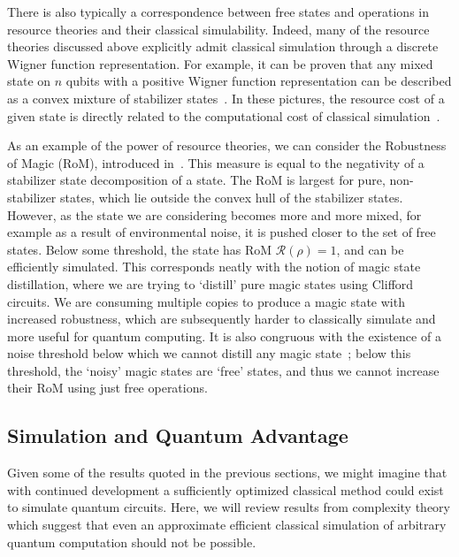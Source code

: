 There is also typically a correspondence between free states and operations in resource theories and their classical simulability. Indeed, many of the resource theories discussed above explicitly admit classical simulation through a discrete Wigner function representation. For example, it can be proven that any mixed state on $n$ qubits with a positive Wigner function representation can be described as a convex mixture of stabilizer states~\cite{Gross2006}. In these pictures, the resource cost of a given state is directly related to the computational cost of classical simulation~\cite{Howard2017,Kocia2017,Seddon2019,Raussendorf2019}.\par
As an example of the power of resource theories, we can consider the Robustness of Magic (RoM), introduced in~\cite{Howard2017}. This measure is equal to the negativity of a stabilizer state decomposition of a state. The RoM is largest for pure, non-stabilizer states, which lie outside the convex hull of the stabilizer states. However, as the state we are considering becomes more and more mixed, for example as a result of environmental noise, it is pushed closer to the set of free states. Below some threshold, the state has RoM $\mathcal{R}\left(\rho\right)=1$, and can be efficiently simulated. This corresponds neatly with the notion of magic state distillation, where we are trying to `distill' pure magic states using Clifford circuits. We are consuming multiple copies to produce a magic state with increased robustness, which are subsequently harder to classically simulate and more useful for quantum computing. It is also congruous with the existence of a noise threshold below which we cannot distill any magic state~\cite{Bravyi2005}; below this threshold, the `noisy' magic states are `free' states, and thus we cannot increase their RoM using just free operations.
\subsection{Simulation and Quantum Advantage}\label{sec:intro_complexity}
Given some of the results quoted in the previous sections, we might imagine that with continued development a sufficiently optimized classical method could exist to simulate quantum circuits. Here, we will review results from complexity theory which suggest that even an approximate efficient classical simulation of arbitrary quantum computation should not be possible.\par
